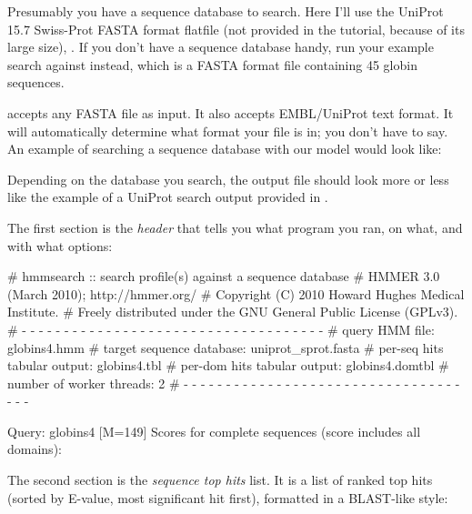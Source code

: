 Presumably you have a sequence database to search. Here I'll use the
UniProt 15.7 Swiss-Prot FASTA format flatfile (not provided in the
tutorial, because of its large size), .  If
you don't have a sequence database handy, run your example search
against  instead, which is a FASTA format
file containing 45 globin sequences.

 accepts any FASTA file as input. It also accepts
EMBL/UniProt text format. It will automatically determine what format
your file is in; you don't have to say. An example of searching a
sequence database with our  model would look like:


Depending on the database you search, the output file
 should look more or less like the example of a
UniProt search output provided in .

The first section is the \emph{header} that tells you what program you
ran, on what, and with what options:

\begin{sreoutput}
# hmmsearch :: search profile(s) against a sequence database
# HMMER 3.0 (March 2010); http://hmmer.org/
# Copyright (C) 2010 Howard Hughes Medical Institute.
# Freely distributed under the GNU General Public License (GPLv3).
# - - - - - - - - - - - - - - - - - - - - - - - - - - - - - - - - - - - -
# query HMM file:                  globins4.hmm
# target sequence database:        uniprot_sprot.fasta
# per-seq hits tabular output:     globins4.tbl
# per-dom hits tabular output:     globins4.domtbl
# number of worker threads:        2
# - - - - - - - - - - - - - - - - - - - - - - - - - - - - - - - - - - - -

Query:       globins4  [M=149]
Scores for complete sequences (score includes all domains):
\end{sreoutput}

The second section is the \emph{sequence top hits} list. It is a list
of ranked top hits (sorted by E-value, most significant hit first),
formatted in a BLAST-like style:

